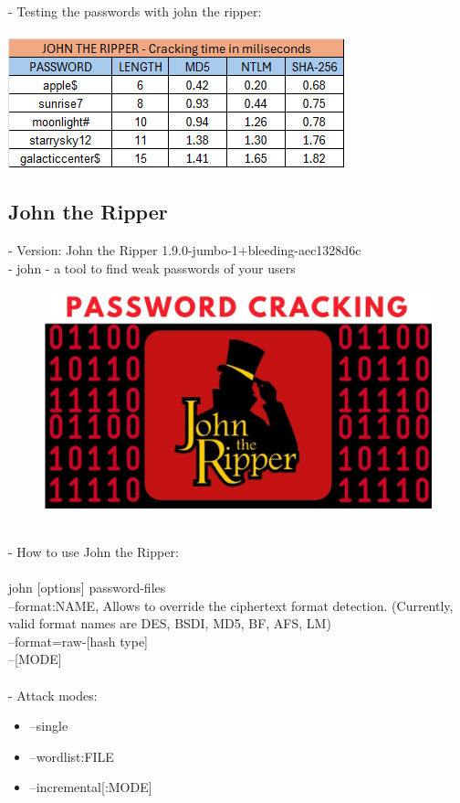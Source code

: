 \documentclass[10pt,oneside,english,a4paper]{article}
\begin{document}
- Testing the passwords with john the ripper:\\\\
\includegraphics[scale = 0.70]{diff_jtr.png}



\pagebreak
\subsection{John the Ripper}
- Version: John the Ripper 1.9.0-jumbo-1+bleeding-aec1328d6c\\
- john - a tool to find weak passwords of your users
\begin{figure}[h]
	\centering
	\includegraphics[scale = 0.10]{John_the_Ripper.jpeg}
\end{figure}\\
- How to use John the Ripper:\\\\
john [options] password-files\\
--format:NAME, Allows to override the ciphertext format detection. (Currently, valid format names are  DES,  BSDI, MD5,  BF,  AFS,  LM)\\
--format=raw-[hash type]\\
--[MODE]\\\\
- Attack modes:
\begin{itemize}
	\item --single
	\item --wordlist:FILE
	\item --incremental[:MODE]
\end{itemize}
\end{document}
